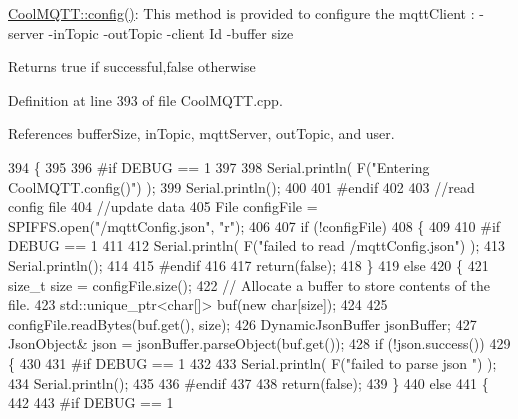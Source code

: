\hyperlink{classCoolMQTT_a6571671781a505feca9a8a56e256c6bc}{Cool\+M\+Q\+T\+T\+::config()}\+: This method is provided to configure the mqtt\+Client \+: -\/server -\/in\+Topic -\/out\+Topic -\/client Id -\/buffer size

\begin{DoxyReturn}{Returns}
true if successful,false otherwise 
\end{DoxyReturn}


Definition at line 393 of file Cool\+M\+Q\+T\+T.\+cpp.



References buffer\+Size, in\+Topic, mqtt\+Server, out\+Topic, and user.


\begin{DoxyCode}
394 \{
395 
396 \textcolor{preprocessor}{#if DEBUG == 1 }
397 
398     Serial.println( F(\textcolor{stringliteral}{"Entering CoolMQTT.config()"}) );
399     Serial.println();
400 
401 \textcolor{preprocessor}{#endif}
402 
403     \textcolor{comment}{//read config file}
404     \textcolor{comment}{//update data}
405     File configFile = SPIFFS.open(\textcolor{stringliteral}{"/mqttConfig.json"}, \textcolor{stringliteral}{"r"});
406 
407     \textcolor{keywordflow}{if} (!configFile) 
408     \{
409     
410 \textcolor{preprocessor}{    #if DEBUG == 1 }
411 
412         Serial.println( F(\textcolor{stringliteral}{"failed to read /mqttConfig.json"}) );
413         Serial.println();
414 
415 \textcolor{preprocessor}{    #endif}
416 
417         \textcolor{keywordflow}{return}(\textcolor{keyword}{false});
418     \}
419     \textcolor{keywordflow}{else}
420     \{
421         \textcolor{keywordtype}{size\_t} size = configFile.size();
422         \textcolor{comment}{// Allocate a buffer to store contents of the file.}
423         std::unique\_ptr<char[]> buf(\textcolor{keyword}{new} \textcolor{keywordtype}{char}[size]);
424 
425         configFile.readBytes(buf.get(), size);
426         DynamicJsonBuffer jsonBuffer;
427         JsonObject& json = jsonBuffer.parseObject(buf.get());
428         \textcolor{keywordflow}{if} (!json.success()) 
429         \{
430         
431 \textcolor{preprocessor}{        #if DEBUG == 1 }
432 
433             Serial.println( F(\textcolor{stringliteral}{"failed to parse json "}) );
434             Serial.println();
435         
436 \textcolor{preprocessor}{        #endif}
437             
438             \textcolor{keywordflow}{return}(\textcolor{keyword}{false});
439         \} 
440         \textcolor{keywordflow}{else}
441         \{
442         
443 \textcolor{preprocessor}{        #if DEBUG == 1 }

\end{DoxyCode}
